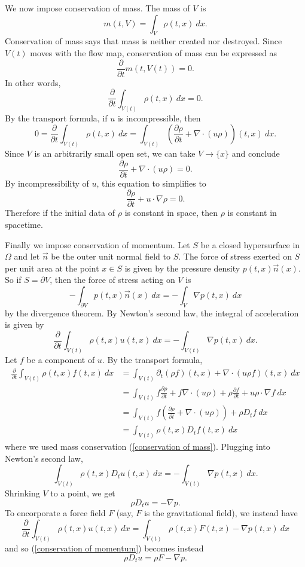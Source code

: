 \documentclass[12pt]{book}
\theoremstyle{definition}
\begin{document}
We now impose conservation of mass.
The mass of $V$ is
$$m(t, V) = \int_V \rho(t, x) ~dx.$$
Conservation of mass says that mass is neither created nor destroyed.
Since $V(t)$ moves with the flow map, conservation of mass can be expressed as
$$\frac{\partial}{\partial t} m(t, V(t)) = 0.$$
In other words,
$$\frac{\partial}{\partial t} \int_{V(t)} \rho(t, x) ~dx = 0.$$
By the transport formula, if $u$ is incompressible, then
$$0 = \frac{\partial}{\partial t} \int_{V(t)} \rho(t, x) ~dx = \int_{V(t)} \left(\frac{\partial \rho}{\partial t} + \nabla \cdot (u\rho)\right)(t, x) ~dx.$$
Since $V$ is an arbitrarily small open set, we can take $V \to \{x\}$ and conclude
$$\frac{\partial \rho}{\partial t} + \nabla \cdot (u\rho) = 0.$$
By incompressibility of $u$, this equation to simplifies to
\begin{equation}
\label{conservation of mass}
\frac{\partial \rho}{\partial t} + u \cdot \nabla \rho = 0.
\end{equation}
Therefore if the initial data of $\rho$ is constant in space, then $\rho$ is constant in spacetime.

Finally we impose conservation of momentum.
Let $S$ be a closed hypersurface in $\Omega$ and let $\vec n$ be the outer unit normal field to $S$.
The force of stress exerted on $S$ per unit area at the point $x \in S$ is given by the pressure density $p(t, x) \vec n(x)$.
So if $S = \partial V$, then the force of stress acting on $V$ is
$$-\int_{\partial V} p(t, x) \vec n(x) ~dx = -\int_V \nabla p(t, x) ~dx$$
by the divergence theorem. By Newton's second law, the integral of acceleration is given by
$$\frac{\partial}{\partial t} \int_{V(t)} \rho(t, x) u(t, x) ~dx = -\int_{V(t)} \nabla p(t, x) ~dx.$$
Let $f$ be a component of $u$. By the transport formula,
\begin{align*}\frac{\partial}{\partial t} \int_{V(t)} \rho(t, x) f(t, x) ~dx &= \int_{V(t)} \partial_t(\rho f)(t, x) + \nabla \cdot(u\rho f)(t, x) ~dx\\
&= \int_{V(t)} f\frac{\partial \rho}{\partial t} + f \nabla \cdot(u\rho) + \rho \frac{\partial f}{\partial t} + u\rho \cdot \nabla f ~dx\\
&= \int_{V(t)} f\left(\frac{\partial \rho}{\partial t} + \nabla \cdot(u\rho)\right) + \rho D_t f ~dx\\
&= \int_{V(t)} \rho(t, x) D_tf(t, x)~dx
\end{align*}
where we used mass conservation (\ref{conservation of mass}). Plugging into Newton's second law,
$$\int_{V(t)} \rho(t, x) D_tu(t, x) ~dx = -\int_{V(t)} \nabla p(t, x) ~dx.$$
Shrinking $V$ to a point, we get
\begin{equation}
\label{conservation of momentum}
\rho D_tu = -\nabla p.
\end{equation}
To encorporate a force field $F$ (say, $F$ is the gravitational field), we instead have
$$\frac{\partial}{\partial t} \int_{V(t)} \rho(t, x) u(t, x) ~dx = \int_{V(t)} \rho(t, x)F(t, x) - \nabla p(t, x) ~dx$$
and so (\ref{conservation of momentum}) becomes instead
\begin{equation}
\label{conservation of momentum with forcing}
\rho D_tu = \rho F - \nabla p.
\end{equation}
\end{document}
